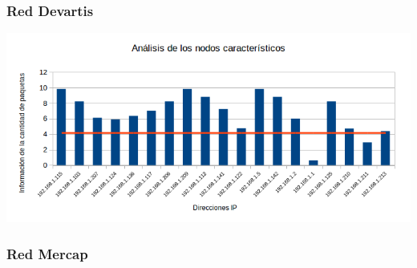 \subsubsection{Red Devartis}

\centerline{\includegraphics[width=1\textwidth]{./graficos/paquetesVSIP/laburo_mari.png}}

\subsubsection{Red Mercap}
